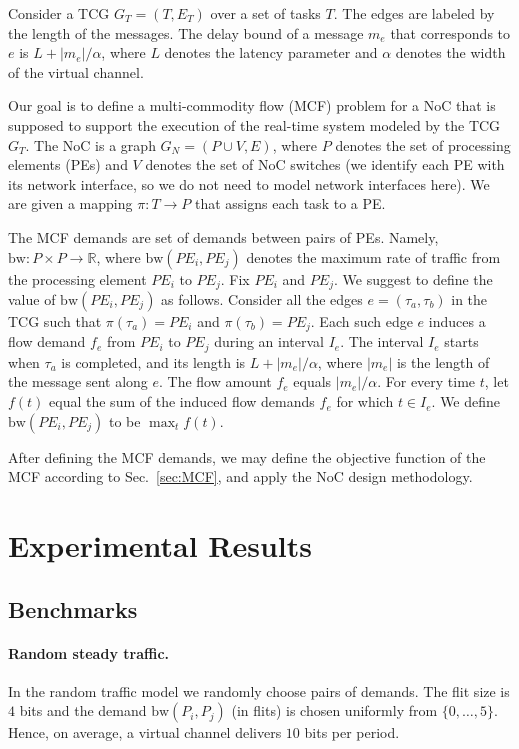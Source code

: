 \documentclass[a4paper,12pt]{article}
\newenvironment{proof sketch}[1]{\noindent {\emph{Proof sketch of #1:}}}{\hfill \qed}
\newcommand{\bw}{\textrm{bw}}
\newcommand{\RR}{\mathbb{R}}
\begin{document}
Consider a TCG $G_T = (T,E_T)$ over a set of tasks $T$. The edges are labeled by the
length of the messages. The delay bound of a message $m_e$ that corresponds to $e$ is
$L+|m_e|/\alpha$, where $L$ denotes the latency parameter and $\alpha$ denotes the width
of the virtual channel.

Our goal is to define a multi-commodity flow (MCF) problem for a NoC that is supposed
to support the execution of the real-time system modeled by the TCG $G_T$.  The NoC
is a graph $G_N=(P\cup V, E)$, where $P$ denotes the set of processing elements
(PEs) and $V$ denotes the set of NoC switches (we identify each PE with its network
interface,  so we do not need to model network interfaces here).  We are given a
mapping $\pi:T\rightarrow P$ that assigns each task to a PE. 

The MCF demands are set of demands between pairs of PEs. Namely, $\bw: P\times P
\rightarrow \RR$, where $\bw(PE_i,PE_j)$ denotes the maximum rate of traffic from the
processing element $PE_i$ to $PE_j$.  Fix $PE_i$ and $PE_j$. We suggest to define the value of
$\bw(PE_i,PE_j)$ as follows.  Consider all the edges $e=(\tau_a,\tau_b)$ in the TCG
such that $\pi(\tau_a)=PE_i$ and $\pi(\tau_b)=PE_j$. Each such edge $e$ induces a
flow demand $f_e$ from $PE_i$ to $PE_j$ during an interval $I_e$. The interval $I_e$
starts when $\tau_a$ is completed, and its length is $L+|m_e|/\alpha$, where
$|m_e|$ is the length of the message sent along $e$.  The flow amount $f_e$ equals
$|m_e|/\alpha$.  For every time $t$, let $f(t)$ equal the sum of the induced flow demands
$f_e$ for which $t\in I_e$. We define $\bw(PE_i,PE_j)$ to be $\max_t f(t)$.

After defining the MCF demands, we may define the objective function of the MCF
according to Sec.~\ref{sec:MCF}, and apply the NoC design methodology.

\section{Experimental Results}\label{sec:exp}
\subsection{Benchmarks}
\paragraph{Random steady traffic.}  In the random traffic model we randomly choose pairs
of demands. The flit size is $4$ bits and the demand $\bw(P_i,P_j)$ (in flits) is chosen
uniformly from $\{0,\ldots,5\}$. Hence, on average, a virtual channel delivers $10$ bits per
period.  
\end{document}
